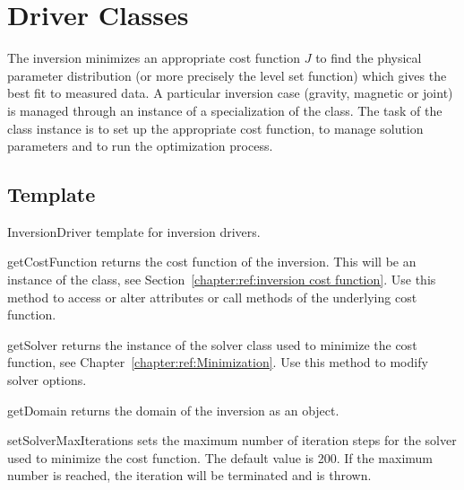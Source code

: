 \section{Driver Classes}\label{chapter:ref:Drivers:Drivers}
The inversion minimizes an appropriate cost function $J$ to find the physical parameter distribution 
(or more precisely the level set function) which gives the best fit to measured data. A 
particular inversion case (gravity, magnetic or joint) is managed through 
an instance of a specialization of the  class. The task of the class instance
is to set up the appropriate cost function, to manage solution parameters and to run the optimization process.

\subsection{Template}
\begin{classdesc*}{InversionDriver}
template for inversion drivers. 
\end{classdesc*}
 
\begin{methoddesc}[InversionDriver]{getCostFunction}{}
returns the cost function of the inversion. This will be an instance of the  class, see Section~\ref{chapter:ref:inversion cost function}.
Use this method to access or alter attributes or call methods of the underlying cost function.
\end{methoddesc}

\begin{methoddesc}[InversionDriver]{getSolver}{}
returns the instance of the solver class used to minimize the cost function, see Chapter~\ref{chapter:ref:Minimization}. 
Use this method to modify solver options.
\end{methoddesc}

\begin{methoddesc}[InversionDriver]{getDomain}{}
returns the domain of the inversion as an \escript {} object.
\end{methoddesc}

        
\begin{methoddesc}[InversionDriver]{setSolverMaxIterations}{}
sets the maximum number of iteration steps for the solver used to minimize the cost function. The default value is 200.
If the maximum number is reached, the iteration will be terminated and  is thrown.
\end{methoddesc}


